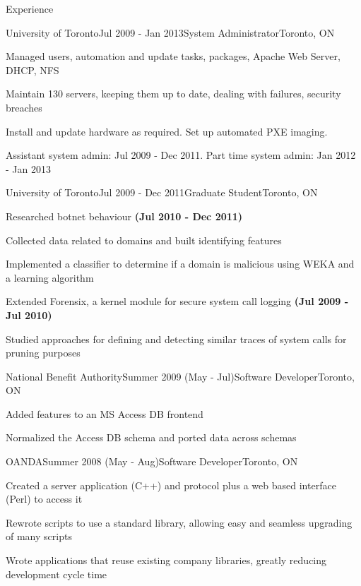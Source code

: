 \documentclass{resume}
\begin{document}
\begin{rSection}{Experience}
    \begin{rSubsection}{University of Toronto}{Jul 2009 - Jan 2013}{System Administrator}{Toronto, ON}
      \item Managed users, automation and update tasks, packages, Apache Web Server, DHCP, NFS
      \item Maintain 130 servers, keeping them up to date, dealing with failures, security breaches
      \item Install and update hardware as required.  Set up automated PXE imaging.
      \item Assistant system admin: Jul 2009 - Dec 2011. Part time system admin: Jan 2012 - Jan 2013
    \end{rSubsection}

    \begin{rSubsection}{University of Toronto}{Jul 2009 - Dec 2011}{Graduate Student}{Toronto, ON}
      \item Researched botnet behaviour \textbf{(Jul 2010 - Dec 2011)}
      \item Collected data related to domains and built identifying features
      \item Implemented a classifier to determine if a domain is malicious using WEKA and a learning algorithm
      \vspace{1ex}
      \item Extended Forensix, a kernel module for secure system call logging \textbf{(Jul 2009 - Jul 2010)}
      \item Studied approaches for defining and detecting similar traces of system calls for pruning purposes
    \end{rSubsection}

    \begin{rSubsection}{National Benefit Authority}{Summer 2009 (May - Jul)}{Software Developer}{Toronto, ON}
      \item Added features to an MS Access DB frontend
      \item Normalized the Access DB schema and ported data across schemas
    \end{rSubsection}

    \begin{rSubsection}{OANDA}{Summer 2008 (May - Aug)}{Software Developer}{Toronto, ON}
      \item Created a server application (C++) and protocol plus a web based interface (Perl) to access it
      \item Rewrote scripts to use a standard library, allowing easy and seamless upgrading of many scripts
      \item Wrote applications that reuse existing company libraries, greatly reducing development cycle time
      \begin{comment}
        \item Added features to existing code, extending an existing Perl script 
        \item Learned to write object oriented Perl libraries and gained experience writing very OOP C++ code
      \end{comment}
    \end{rSubsection}


\end{rSection}
\end{document}
